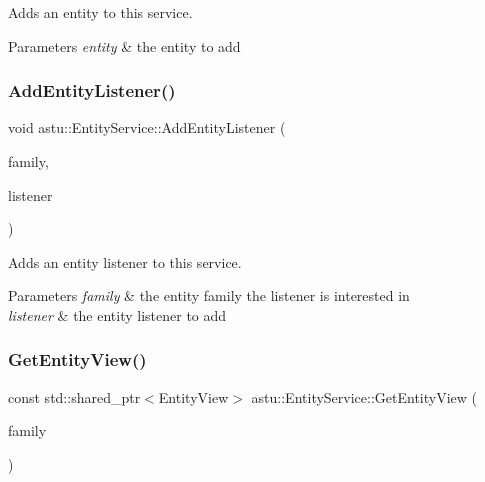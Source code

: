 Adds an entity to this service.


\begin{DoxyParams}{Parameters}
{\em entity} & the entity to add \\
\hline
\end{DoxyParams}
\mbox{\label{classastu_1_1EntityService_aa611795e8eca81a83909c9a71551a981}} 
\subsubsection{\texorpdfstring{Add\+Entity\+Listener()}{AddEntityListener()}}
{\footnotesize\ttfamily void astu\+::\+Entity\+Service\+::\+Add\+Entity\+Listener (\begin{DoxyParamCaption}\item[{const \hyperlink{classastu_1_1EntityFamily}{Entity\+Family} \&}]{family,  }\item[{std\+::shared\+\_\+ptr$<$ \hyperlink{classastu_1_1IEntityListener}{I\+Entity\+Listener} $>$}]{listener }\end{DoxyParamCaption})}

Adds an entity listener to this service.


\begin{DoxyParams}{Parameters}
{\em family} & the entity family the listener is interested in \\
\hline
{\em listener} & the entity listener to add \\
\hline
\end{DoxyParams}
\mbox{\label{classastu_1_1EntityService_aa295c07eb6a5c5321cf5820c9e41d008}} 
\subsubsection{\texorpdfstring{Get\+Entity\+View()}{GetEntityView()}}
{\footnotesize\ttfamily const std\+::shared\+\_\+ptr$<$Entity\+View$>$ astu\+::\+Entity\+Service\+::\+Get\+Entity\+View (\begin{DoxyParamCaption}\item[{const \hyperlink{classastu_1_1EntityFamily}{Entity\+Family} \&}]{family }\end{DoxyParamCaption})}

